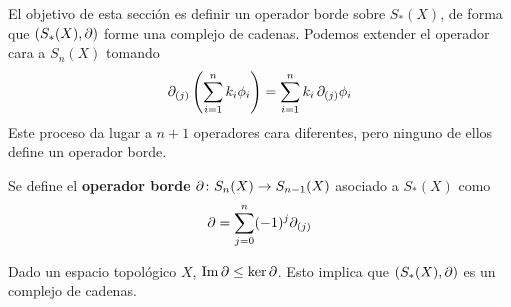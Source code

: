 El objetivo de esta sección es definir un operador borde sobre $S_*(X)$, de
forma que $(S_*(X),\partial)$ forme una complejo de cadenas. Podemos extender el
operador cara a $S_n(X)$ tomando
\[\partial_{(j)}\left(\sum_{i=1}^n k_i\phi_i\right)= \sum^n_{i=1}k_i\,\partial_{(j)}\phi_i\]
Este proceso da lugar a $n+1$ operadores cara diferentes, pero ninguno de ellos
define un operador borde.

\begin{definition}
Se define el \textbf{operador borde} $\partial\colon S_n(X) \to
S_{n-1}(X)$ asociado a $S_*(X)$ como
\[\partial=\sum^n_{j=0}(-1)^j\partial_{(j)}\]
\end{definition}

\begin{theorem}
Dado un espacio topológico $X$, $\operatorname{Im} \partial \leq \ker \partial$. Esto implica que $(S_*(X),
\partial)$ es un complejo de cadenas.
\end{theorem}


